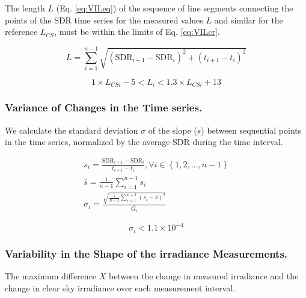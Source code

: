 \documentclass[preprint, 3p,
authoryear]{elsarticle} %
\begin{document}
The length \(L\) (Eq. \ref{eq:VILeq}) of the sequence of line segments
connecting the points of the SDR time series for the measured values
\(L\) and similar for the reference \(L_{CS}\), must be within the
limits of Eq. \ref{eq:VILcr}.

\begin{equation}
L = \sum_{i=1}^{n-1}\sqrt{\left ( \text{SDR}_{i+1} - \text{SDR}_{i}\right )^2 + \left ( t_{i+1} - t_i \right )^2}
\label{eq:VILeq}
\end{equation}

\begin{equation}
1 \times L_{CSi} - 5 < L_i < 1.3 \times L_{CSi} + 13
\label{eq:VILcr}
\end{equation}

\hypertarget{variance-of-changes-in-the-time-series.}{%
\subsubsection{Variance of Changes in the Time
series.}\label{variance-of-changes-in-the-time-series.}}

We calculate the standard deviation \(\sigma\) of the slope (\(s\))
between sequential points in the time series, normalized by the average
SDR during the time interval.

\begin{gather}
s_i = \frac{\text{SDR}_{i+1} - \text{SDR}_{i}}{t_{i+1} - t_i}, \forall i \in \left \{ 1, 2, \ldots, n-1 \right \} \label{eq:VCT1} \\
\bar{s} = \frac{1}{n-1} \sum_{i=1}^{n-1} s_i \label{eq:VCT2} \\
\sigma_i = \frac {\sqrt{\frac{1}{n-1} \sum_{i=1}^{n-1} \left( s_i - \bar{s} \right)^2} } {\bar{G_i}} \label{eq:VCT3}
\end{gather}

\begin{equation}
\sigma_i < \ensuremath{1.1\times 10^{-4}}
\label{eq:VCTcr}
\end{equation}

\hypertarget{variability-in-the-shape-of-the-irradiance-measurements.}{%
\subsubsection{Variability in the Shape of the irradiance
Measurements.}\label{variability-in-the-shape-of-the-irradiance-measurements.}}

The maximum difference \(X\) between the change in measured irradiance
and the change in clear sky irradiance over each measurement interval.
\end{document}
